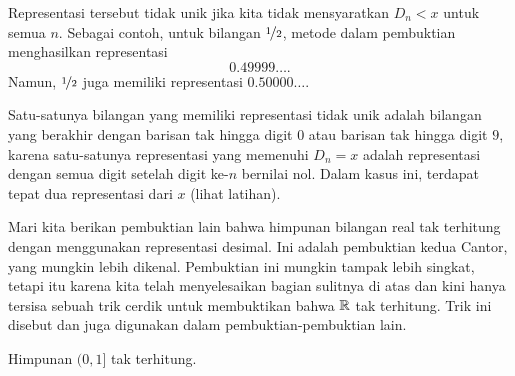 Representasi tersebut tidak unik jika kita tidak mensyaratkan
$D_n < x$ untuk semua $n$.
Sebagai contoh, untuk
bilangan $\nicefrac{1}{2}$, metode dalam pembuktian menghasilkan representasi
\begin{equation*}
0.49999\ldots .
\end{equation*}
Namun, $\nicefrac{1}{2}$ juga memiliki representasi $0.50000\ldots$.

Satu-satunya bilangan yang memiliki representasi tidak unik
adalah bilangan yang berakhir dengan barisan tak hingga digit $0$
atau barisan tak hingga digit $9$, karena satu-satunya representasi yang memenuhi
$D_n = x$ adalah representasi dengan semua digit setelah digit ke-$n$ bernilai nol.
Dalam kasus ini,
terdapat tepat dua representasi dari $x$ (lihat latihan).

Mari kita berikan pembuktian lain bahwa himpunan bilangan real tak terhitung dengan
menggunakan representasi desimal.
Ini adalah pembuktian kedua Cantor, yang mungkin lebih dikenal.
Pembuktian ini mungkin tampak lebih singkat, tetapi itu karena kita telah menyelesaikan
bagian sulitnya di atas dan kini hanya tersisa sebuah trik cerdik untuk membuktikan bahwa ${\mathbb{R}}$
tak terhitung.  Trik ini disebut
\emph{} dan
juga digunakan dalam pembuktian-pembuktian lain.

\begin{thm}[Cantor]
Himpunan $(0,1]$ tak terhitung.
\end{thm}

